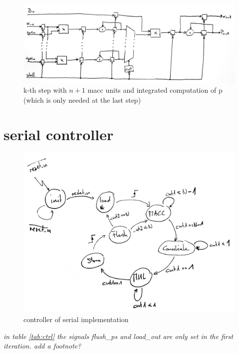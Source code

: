 \documentclass[mscthesis]{usiinfthesis}
\begin{document}
\begin{figure}
    \includegraphics[width=1\columnwidth]{./schema/arch_step_p.png}
    \caption{k-th step with $ n+1 $ macc units and integrated computation of p
        (which is only needed at the last step)}
    \label{fig:step_p}
\end{figure}

\section{serial controller}

\begin{figure}
    \includegraphics[width=1\columnwidth]{./schema/arch_ctrl.png}
    \caption{controller of serial implementation}
    \label{fig:ctrl}
\end{figure}

\emph{\color{red} in table \ref{tab:ctrl} the signals flush\_ps and load\_out
are only set in the first iteration. add a footnote?}
\end{document}
